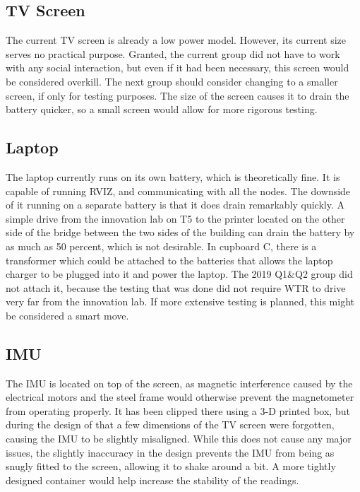 \subsection{TV Screen}
The current TV screen is already a low power model.
However, its current size serves no practical purpose.
Granted, the current group did not have to work with any social interaction, but even if it had been necessary, this screen would be considered overkill.
The next group should consider changing to a smaller screen, if only for testing purposes.
The size of the screen causes it to drain the battery quicker, so a small screen would allow for more rigorous testing.

\subsection{Laptop}
The laptop currently runs on its own battery, which is theoretically fine.
It is capable of running RVIZ, and communicating with all the nodes.
The downside of it running on a separate battery is that it does drain remarkably quickly.
A simple drive from the innovation lab on T5 to the printer located on the other side of the bridge between the two sides of the building can drain the battery by as much as 50 percent, which is not desirable.
In cupboard C, there is a transformer which could be attached to the batteries that allows the laptop charger to be plugged into it and power the laptop.
The 2019 Q1\&Q2 group did not attach it, because the testing that was done did not require WTR to drive very far from the innovation lab.
If more extensive testing is planned, this might be considered a smart move.

\subsection{IMU}
The IMU is located on top of the screen, as magnetic interference caused by the electrical motors and the steel frame would otherwise prevent the magnetometer from operating properly.
It has been clipped there using a 3-D printed box, but during the design of that a few dimensions of the TV screen were forgotten, causing the IMU to be slightly misaligned.
While this does not cause any major issues, the slightly inaccuracy in the design prevents the IMU from being as snugly fitted to the screen, allowing it to shake around a bit.
A more tightly designed container would help increase the stability of the readings.

\newpage

